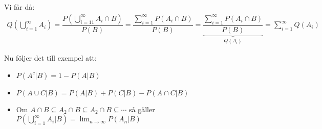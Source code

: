 \par\bigskip
\noindent Vi får då:
\begin{equation*}
  \begin{gathered}
    Q\left(\bigcup_{i=1}^{\infty}A_i\right) = \dfrac{P(\bigcup_{i=11}^{\infty}A_i\cap B)}{P(B)} = \dfrac{\sum_{i=1}^{\infty}P(A_i\cap B)}{P(B)} = \underbrace{\dfrac{\sum_{i=1}^{\infty}P(A_i\cap B)}{P(B)}}_{\text{$Q(A_i)$}} = \sum_{i=1}^{\infty}Q(A_i)
  \end{gathered}
\end{equation*}
\par\bigskip
\noindent Nu följer det till exempel att:
\begin{itemize}
  \item $P(A^c|B) = 1-P(A|B)$
  \item $P(A\cup C| B) = P(A|B)+P(C|B)-P(A\cap C |B)$
  \item Om $A\cap B\subseteq A_2\cap B\subseteq A_2\cap B\subseteq\cdots$ så gäller $P\left(\bigcup_{i=1}^{\infty}A_i|B\right) = \lim_{n\to\infty}P(A_n|B)$
\end{itemize}
\par\bigskip

